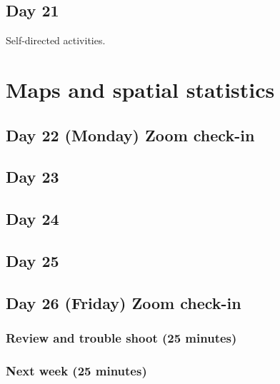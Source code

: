 \documentclass[
]{book}
\begin{document}
\hypertarget{day-21}{%
\section{Day 21}\label{day-21}}

Self-directed activities.

\hypertarget{four}{%
\chapter{Maps and spatial statistics}\label{four}}

\hypertarget{day-22-monday-zoom-check-in}{%
\section{Day 22 (Monday) Zoom check-in}\label{day-22-monday-zoom-check-in}}

\hypertarget{day-23}{%
\section{Day 23}\label{day-23}}

\hypertarget{day-24}{%
\section{Day 24}\label{day-24}}

\hypertarget{day-25}{%
\section{Day 25}\label{day-25}}

\hypertarget{day-26-friday-zoom-check-in}{%
\section{Day 26 (Friday) Zoom check-in}\label{day-26-friday-zoom-check-in}}

\hypertarget{review-and-trouble-shoot-25-minutes-1}{%
\subsection{Review and trouble shoot (25 minutes)}\label{review-and-trouble-shoot-25-minutes-1}}

\hypertarget{next-week-25-minutes-1}{%
\subsection{Next week (25 minutes)}\label{next-week-25-minutes-1}}
\end{document}
